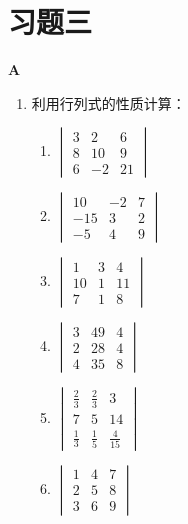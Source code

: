 \section*{习题三}
\begin{center}
  \bfseries A
\end{center}
\begin{enumerate}
  \item 利用行列式的性质计算：
\begin{multicols}{3}
\begin{enumerate}[(1)]
  \item $\begin{vmatrix}3&2&6\\8&10&9\\6&-2&21\end{vmatrix}$
  \item $\begin{vmatrix}10&-2&7\\-15&3&2\\-5&4&9\end{vmatrix}$
  \item $\begin{vmatrix}1&3&4\\10&1&11\\7&1&8\end{vmatrix}$
  \item $\begin{vmatrix}3&49&4\\2&28&4\\4&35&8\end{vmatrix}$
  \item $\begin{vmatrix}
    \frac{2}{3}&\frac{2}{3}&3\\7&5&14\\
    \frac{1}{3}&\frac{1}{5}&\frac{4}{15}
  \end{vmatrix}$
  \item $\begin{vmatrix}
    1&4&7\\2&5&8\\3&6&9
  \end{vmatrix}$
\end{enumerate}
\end{multicols}


\end{enumerate}
